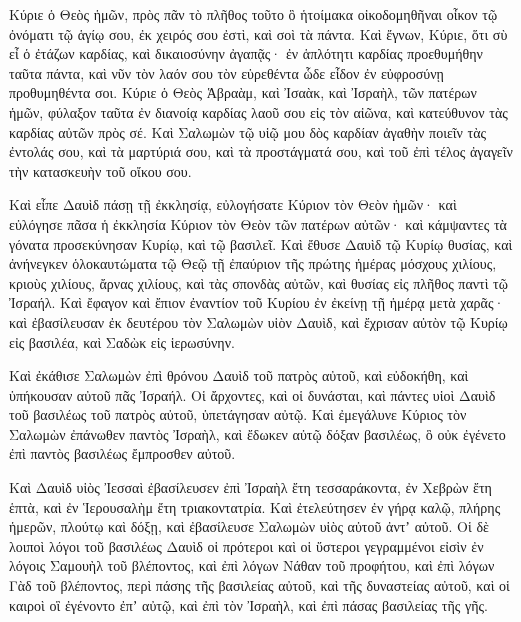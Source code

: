 {Κύριε ὁ Θεὸς ἡμῶν, πρὸς πᾶν τὸ πλῆθος τοῦτο ὃ ἡτοίμακα οἰκοδομηθῆναι οἶκον τῷ ὀνόματι τῷ ἁγίῳ σου, ἐκ χειρός σου ἐστὶ, καὶ σοὶ τὰ πάντα.
Καὶ ἔγνων, Κύριε, ὅτι σὺ εἶ ὁ ἐτάζων καρδίας, καὶ δικαιοσύνην ἀγαπᾷς· ἐν ἁπλότητι καρδίας προεθυμήθην ταῦτα πάντα, καὶ νῦν τὸν λαόν σου τὸν εὑρεθέντα ὧδε εἶδον ἐν εὐφροσύνῃ προθυμηθέντα σοι.
Κύριε ὁ Θεὸς Ἁβραὰμ, καὶ Ἰσαὰκ, καὶ Ἰσραὴλ, τῶν πατέρων ἡμῶν, φύλαξον ταῦτα ἐν διανοίᾳ καρδίας λαοῦ σου εἰς τὸν αἰῶνα, καὶ κατεύθυνον τὰς καρδίας αὐτῶν πρὸς σέ.
Καὶ Σαλωμὼν τῷ υἱῷ μου δὸς καρδίαν ἀγαθὴν ποιεῖν τὰς ἐντολάς σου, καὶ τὰ μαρτύριά σου, καὶ τὰ προστάγματά σου, καὶ τοῦ ἐπὶ τέλος ἀγαγεῖν τὴν κατασκευὴν τοῦ οἴκου σου.
\par }{\PP {}Καὶ εἶπε Δαυὶδ πάσῃ τῇ ἐκκλησίᾳ, εὐλογήσατε Κύριον τὸν Θεὸν ἡμῶν· καὶ εὐλόγησε πᾶσα ἡ ἐκκλησία Κύριον τὸν Θεὸν τῶν πατέρων αὐτῶν· καὶ κάμψαντες τὰ γόνατα προσεκύνησαν Κυρίῳ, καὶ τῷ βασιλεῖ.
Καὶ ἔθυσε Δαυὶδ τῷ Κυρίῳ θυσίας, καὶ ἀνήνεγκεν ὁλοκαυτώματα τῷ Θεῷ τῇ ἐπαύριον τῆς πρώτης ἡμέρας μόσχους χιλίους, κριοὺς χιλίους, ἄρνας χιλίους, καὶ τὰς σπονδὰς αὐτῶν, καὶ θυσίας εἰς πλῆθος παντὶ τῷ Ἰσραήλ.
Καὶ ἔφαγον καὶ ἔπιον ἐναντίον τοῦ Κυρίου ἐν ἐκείνῃ τῇ ἡμέρᾳ μετὰ χαρᾶς· καὶ ἐβασίλευσαν ἐκ δευτέρου τὸν Σαλωμὼν υἱὸν Δαυὶδ, καὶ ἔχρισαν αὐτὸν τῷ Κυρίῳ εἰς βασιλέα, καὶ Σαδὼκ εἰς ἱερωσύνην.
\par }{\PP {}Καὶ ἐκάθισε Σαλωμὼν ἐπὶ θρόνου Δαυὶδ τοῦ πατρὸς αὐτοῦ, καὶ εὐδοκήθη, καὶ ὑπήκουσαν αὐτοῦ πᾶς Ἰσραήλ.
Οἱ ἄρχοντες, καὶ οἱ δυνάσται, καὶ πάντες υἱοὶ Δαυὶδ τοῦ βασιλέως τοῦ πατρὸς αὐτοῦ, ὑπετάγησαν αὐτῷ.
Καὶ ἐμεγάλυνε Κύριος τὸν Σαλωμὼν ἐπάνωθεν παντὸς Ἰσραὴλ, καὶ ἔδωκεν αὐτῷ δόξαν βασιλέως, ὃ οὐκ ἐγένετο ἐπὶ παντὸς βασιλέως ἔμπροσθεν αὐτοῦ.
\par }{\PP {}Καὶ Δαυὶδ υἱὸς Ἰεσσαὶ ἐβασίλευσεν ἐπὶ Ἰσραὴλ
ἔτη τεσσαράκοντα, ἐν Χεβρὼν ἔτη ἑπτὰ, καὶ ἐν Ἱερουσαλὴμ ἔτη τριακοντατρία.
Καὶ ἐτελεύτησεν ἐν γήρᾳ καλῷ, πλήρης ἡμερῶν, πλούτῳ καὶ δόξῃ, καὶ ἐβασίλευσε Σαλωμὼν υἱὸς αὐτοῦ ἀντʼ αὐτοῦ.
Οἱ δὲ λοιποὶ λόγοι τοῦ βασιλέως Δαυὶδ οἱ πρότεροι καὶ οἱ ὕστεροι γεγραμμένοι εἰσὶν ἐν λόγοις Σαμουὴλ τοῦ βλέποντος, καὶ ἐπὶ λόγων Νάθαν τοῦ προφήτου, καὶ ἐπὶ λόγων Γὰδ τοῦ βλέποντος,
περὶ πάσης τῆς βασιλείας αὐτοῦ, καὶ τῆς δυναστείας αὐτοῦ, καὶ οἱ καιροὶ οἳ ἐγένοντο ἐπʼ αὐτῷ, καὶ ἐπὶ τὸν Ἰσραὴλ, καὶ ἐπὶ πάσας βασιλείας τῆς γῆς.
\par }